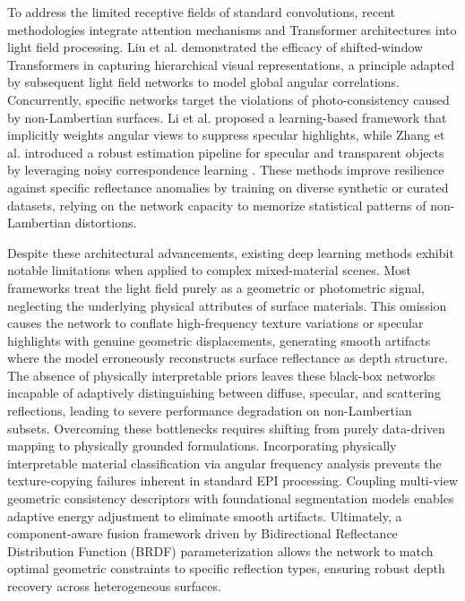 \documentclass[lettersize,journal]{IEEEtran}
\begin{document}
To address the limited receptive fields of standard convolutions, recent methodologies integrate attention mechanisms and Transformer architectures \cite{vaswani2017, dosovitskiy2021} into light field processing. Liu et al. \cite{liu2021} demonstrated the efficacy of shifted-window Transformers in capturing hierarchical visual representations, a principle adapted by subsequent light field networks to model global angular correlations. Concurrently, specific networks target the violations of photo-consistency caused by non-Lambertian surfaces. Li et al. \cite{li2021} proposed a learning-based framework that implicitly weights angular views to suppress specular highlights, while Zhang et al. \cite{zhang2023} introduced a robust estimation pipeline for specular and transparent objects by leveraging noisy correspondence learning \cite{wang2023}. These methods improve resilience against specific reflectance anomalies by training on diverse synthetic or curated datasets, relying on the network capacity to memorize statistical patterns of non-Lambertian distortions.

Despite these architectural advancements, existing deep learning methods exhibit notable limitations when applied to complex mixed-material scenes. Most frameworks treat the light field purely as a geometric or photometric signal, neglecting the underlying physical attributes of surface materials. This omission causes the network to conflate high-frequency texture variations or specular highlights with genuine geometric displacements, generating smooth artifacts where the model erroneously reconstructs surface reflectance as depth structure. The absence of physically interpretable priors leaves these black-box networks incapable of adaptively distinguishing between diffuse, specular, and scattering reflections, leading to severe performance degradation on non-Lambertian subsets. Overcoming these bottlenecks requires shifting from purely data-driven mapping to physically grounded formulations. Incorporating physically interpretable material classification via angular frequency analysis prevents the texture-copying failures inherent in standard EPI processing. Coupling multi-view geometric consistency descriptors with foundational segmentation models \cite{kirillov2023} enables adaptive energy adjustment to eliminate smooth artifacts. Ultimately, a component-aware fusion framework driven by Bidirectional Reflectance Distribution Function (BRDF) parameterization \cite{blinn1977} allows the network to match optimal geometric constraints to specific reflection types, ensuring robust depth recovery across heterogeneous surfaces.
\end{document}
